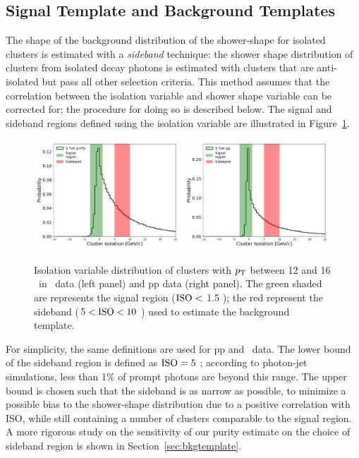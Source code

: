 \subsection{Signal Template and Background Templates }
The shape of the background distribution of the shower-shape for isolated clusters is estimated with a \textit{sideband} technique: the shower shape distribution of clusters from isolated decay photons is estimated with clusters that are anti-isolated but pass all other selection criteria. This method assumes that the correlation between the isolation variable and shower shape variable can be corrected for; the procedure for doing so is described below. The signal and sideband regions defined using the isolation variable are illustrated in Figure~\ref{SidebandDefinition}. 

\begin{figure}[h]
\center
\includegraphics[width=0.49\textwidth]{Data_Analysis/Purity/IsolationSideband_limited_Skimmed_13def_root}
\includegraphics[width=0.49\textwidth]{Data_Analysis/Purity/IsolationSideband_limited_Skimmed_17q_root}
\caption{Isolation variable distribution of clusters with $p_{\mathrm{T}}$ between 12 and 16 \GeVc~in \pPb~data (left panel) and pp data (right panel). The green shaded are represents the signal region ($\mathrm{ISO}<$ 1.5 \GeVc); the red represent the sideband ($5<\mathrm{ISO}<10$ \GeVc) used to estimate the background template.}
\label{SidebandDefinition}
\end{figure}

For simplicity, the same definitions are used for pp and \pPb~data. The lower bound of the sideband region is defined as {$\mathrm{ISO}=5$ \GeVc}; according to photon-jet simulations, less than 1$\%$ of prompt photons are beyond this range. The upper bound is chosen such that the sideband is as narrow as possible, to minimize a possible bias to the shower-shape distribution due to a positive correlation with ISO, while still containing a number of clusters comparable to the signal region. A more rigorous study on the sensitivity of our purity estimate on the choice of sideband region is shown in Section~\ref{sec:bkgtemplate}.

